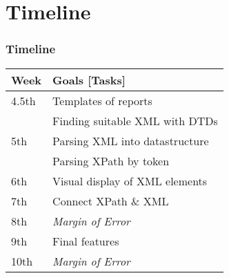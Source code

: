 \documentclass{beamer}
\begin{document}
\section{Timeline}
\begin{frame}
\frametitle{Timeline}
\begin{tabular}{l|l}
Week 	& Goals [Tasks] 							\\	
\hline
\hline
4.5th	& Templates of reports 			\\
 		& Finding suitable XML with DTDs 		\\
\hline
5th		& Parsing XML into datastructure \\
		& Parsing XPath by token 			\\
\hline
6th		& Visual display of XML elements 	\\
\hline
7th		& Connect XPath \& XML 			\\
\hline
8th		& \emph{Margin of Error}							\\
\hline
9th		& Final features					\\
\hline
10th	& \emph{Margin of Error}							\\
\hline
\end{tabular}
\end{frame}
\end{document}
